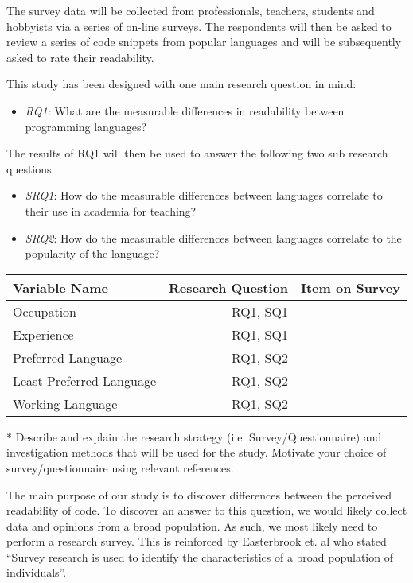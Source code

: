 \documentclass[times, 10pt,twocolumn]{IEEEtran}
\begin{document}
The survey data will be collected from professionals, teachers, students and hobbyists via a series of on-line surveys. The respondents will then be asked to review a series of code snippets from popular languages and will be subsequently asked to rate their readability. 
\newline

This study has been designed with one main research question in mind:
\begin{itemize}
\item \textit{RQ1:} What are the measurable differences in readability between programming languages?
\end{itemize}


The results of RQ1 will then be used to answer the following two sub research questions. 
\begin{itemize}
\item \textit{SRQ1}: How do the measurable differences between languages correlate to their use in academia for teaching?
\item \textit{SRQ2}: How do the measurable differences between languages correlate to the popularity of the language?
\end{itemize}

\begin{tabular}{| l | r | c |}
	\hline
	\textbf{Variable Name} & \textbf{Research Question} & \textbf{Item on Survey} \\ \hline
	Occupation & RQ1, SQ1 & \\ \hline
	Experience & RQ1, SQ1 & \\ \hline
	Preferred Language & RQ1, SQ2 & \\ \hline
	Least Preferred Language & RQ1, SQ2& \\  \hline
	Working Language & RQ1, SQ2 & \\ 
	\hline
	\end{tabular}

* Describe  and explain the research  strategy (i.e.  Survey/Questionnaire)
and investigation methods that  will  be  used  for the study.  Motivate  your  
choice  of  survey/questionnaire  using relevant  references.

The main purpose of our study is to discover differences between the perceived readability of code. To discover an answer to this question, we would likely collect data and opinions from a broad population. As such, we most likely need to perform a research survey. This is reinforced by Easterbrook et. al \cite{easterbrook2008selecting} who stated ``Survey research is used to identify the characteristics of a broad population of individuals''.
\end{document}
